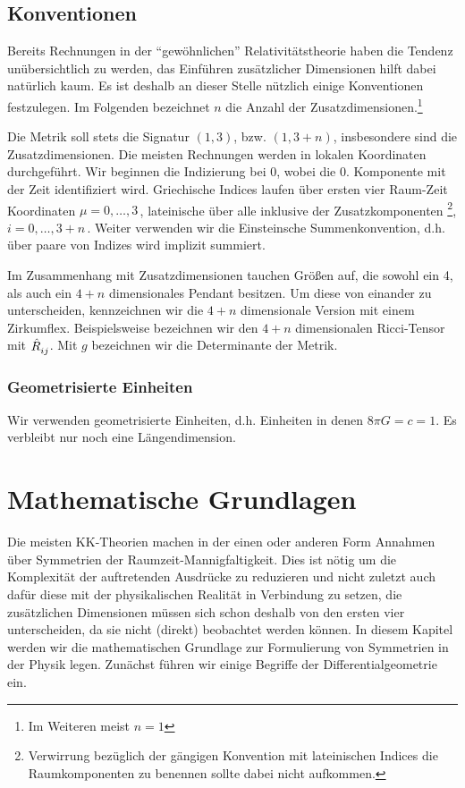 \section{Konventionen}
Bereits Rechnungen in der "`gewöhnlichen"' Relativitätstheorie haben die Tendenz
unübersichtlich zu werden, das Einführen zusätzlicher Dimensionen hilft dabei
natürlich kaum.
Es ist deshalb an dieser Stelle nützlich einige Konventionen festzulegen. Im
Folgenden bezeichnet $n$ die Anzahl der Zusatzdimensionen.\footnote{Im Weiteren
meist $n=1$}

Die Metrik soll stets die Signatur $(1,3)$, bzw. $(1,3+n)$, insbesondere sind
die Zusatzdimensionen. Die meisten Rechnungen werden in lokalen Koordinaten
durchgeführt.
Wir beginnen die Indizierung bei 0, wobei die 0. Komponente mit der Zeit identifiziert wird.
Griechische Indices laufen über ersten vier Raum-Zeit Koordinaten
$\mu=0,\ldots,3\,$, lateinische über alle inklusive der
Zusatzkomponenten \footnote{Verwirrung bezüglich der gängigen Konvention
mit lateinischen Indices die Raumkomponenten zu benennen sollte dabei nicht
aufkommen.}, $i=0,\ldots,3+n\,$. Weiter verwenden wir die Einsteinsche
Summenkonvention, d.h. über paare von Indizes wird implizit summiert.

Im Zusammenhang mit Zusatzdimensionen tauchen Größen auf, die sowohl ein 4, als
auch ein $4+n$ dimensionales Pendant besitzen. Um diese von einander zu
unterscheiden, kennzeichnen wir die $4+n$ dimensionale Version mit einem
Zirkumflex.
Beispielsweise bezeichnen wir den $4+n$ dimensionalen Ricci-Tensor mit
$\tensor{\hat{R}}{_i_j}$. Mit $g$ bezeichnen wir die Determinante der Metrik.
\subsection*{Geometrisierte Einheiten}
Wir verwenden geometrisierte Einheiten, d.h. Einheiten in denen
$8\pi G=c=1$. Es verbleibt nur noch eine Längendimension.
\chapter{Mathematische Grundlagen}
Die meisten KK-Theorien machen in der einen oder anderen Form Annahmen über
Symmetrien der Raumzeit-Mannigfaltigkeit. Dies ist nötig um die Komplexität der
auftretenden Ausdrücke zu reduzieren und nicht zuletzt auch dafür diese mit der
physikalischen Realität in Verbindung zu setzen, die zusätzlichen Dimensionen
müssen sich schon deshalb von den ersten vier unterscheiden, da sie nicht
(direkt) beobachtet werden können.
In diesem Kapitel werden wir die mathematischen Grundlage zur Formulierung von
Symmetrien in der Physik legen. Zunächst führen wir einige Begriffe der Differentialgeometrie
ein.
